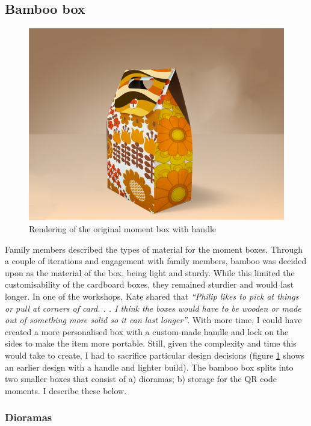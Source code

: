 \subsection{Bamboo box}
\label{Bamboo box}

\begin{figure}[htp]
\centering
\includegraphics[width=.6\linewidth]{Images/ChapterFour/originalDesign.png}
\caption{Rendering of the original moment box with handle}
\label{fig:oldDesign}
\end{figure}
Family members described the types of material for the moment boxes. Through a couple of iterations and engagement with family members, bamboo was decided upon as the material of the box, being light and sturdy. While this limited the customisability of the cardboard boxes, they remained sturdier and would last longer. In one of the workshops, Kate shared that \textit{``Philip likes to pick at things or pull at corners of card. . . I think the boxes would have to be wooden or made out of something more solid so it can last longer''}. With more time, I could have created a more personalised box with a custom-made handle and lock on the sides to make the item more portable. Still, given the complexity and time this would take to create, I had to sacrifice particular design decisions (figure \ref{fig:oldDesign} shows an earlier design with a handle and lighter build). The bamboo box splits into two smaller boxes that consist of a) dioramas; b) storage for the QR code moments. I describe these below.

\subsubsection{Dioramas}
\label{Dioramas}

